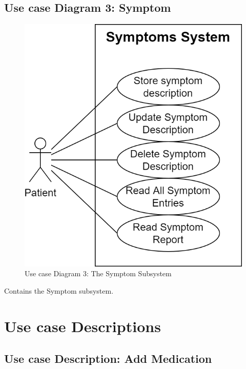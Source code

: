 \documentclass[11pt]{article}
\begin{document}
    \subsection{Use case Diagram 3: Symptom}\label{subsec:use-case-diagram-3:-Symptom}
    \begin{figure}[H]
        \centering
        \includegraphics[height=0.3\textheight]{Diagrams/Use Case Diagrams/Use Case Diagram 3}
        \caption{Use case Diagram 3: The Symptom Subsystem}
        \label{fig:Use case Diagram 3: The Symptom Subsystem}
    \end{figure}

    Contains the Symptom subsystem.

    \pagebreak


    \section{Use case Descriptions}\label{sec:use-case-descriptions}

    \subsection{Use case Description: Add Medication}\label{subsec:use-case-description:-add-medication}
\end{document}
